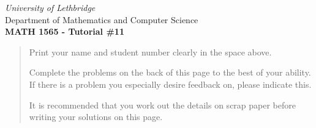 \documentclass[12pt]{article}
\newcommand{\skipline}{\vspace{12pt}}
\begin{document}
\author{Instructor: Sean Fitzpatrick}
\thispagestyle{empty}
\begin{center}
\emph{University of Lethbridge}\\
Department of Mathematics and Computer Science\\
{\bf MATH 1565 - Tutorial \#11}\\
\end{center}



\vspace{0.1in}

\vspace*{\fill}

\begin{quote}
Print your name and student number clearly in the space above. 

\medskip

Complete the problems on the back of this page to the best of your ability. If there is a problem you especially desire feedback on, please indicate this. 

\medskip

It is recommended that you work out the details on scrap paper before writing your solutions on this page.
\end{quote}
\newpage
\end{document}
